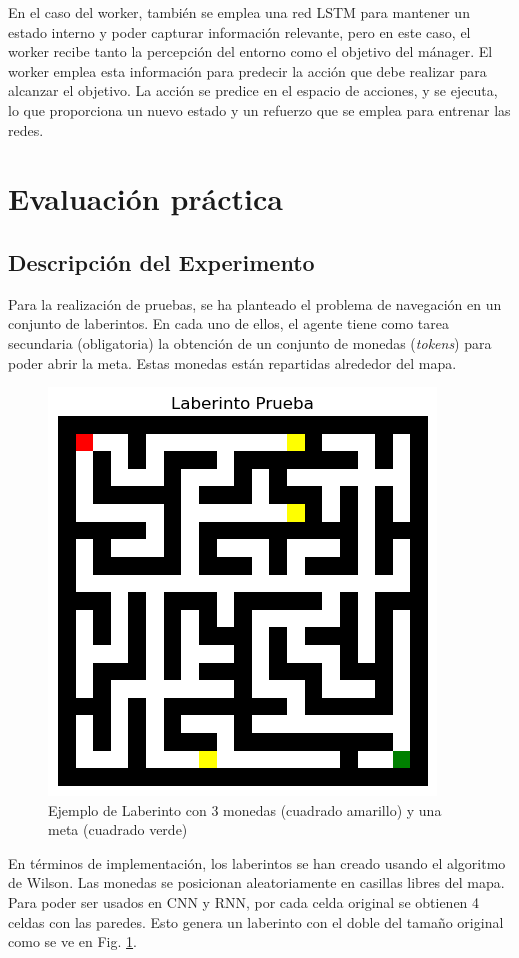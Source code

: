 \documentclass[letterpaper]{article} %
\begin{document}
En el caso del worker, también se emplea una red LSTM para mantener un estado interno y poder capturar información relevante,
pero en este caso, el worker recibe tanto la percepción del entorno como el objetivo del mánager. El worker emplea esta información
para predecir la acción que debe realizar para alcanzar el objetivo. La acción se predice en el espacio de acciones, y se ejecuta,
lo que proporciona un nuevo estado y un refuerzo que se emplea para entrenar las redes.

\section{Evaluación práctica}
\subsection{Descripción del Experimento}

Para la realización de pruebas, se ha planteado el problema de navegación en un conjunto de laberintos. 
En cada uno de ellos, el agente tiene como tarea secundaria (obligatoria) la obtención de un conjunto de 
monedas (\textit{tokens}) para poder abrir la meta. Estas monedas están repartidas alrededor del mapa.

\begin{figure}[H]
    \centering
    \includegraphics[width=0.7\columnwidth]{maze.png}
    \caption{Ejemplo de Laberinto con 3 monedas (cuadrado amarillo) y una meta (cuadrado verde)\label{fig:maze-example}}
\end{figure}

En términos de implementación, los laberintos se han creado usando el algoritmo de Wilson. Las monedas se posicionan
aleatoriamente en casillas libres del mapa. Para poder ser usados en CNN y RNN, por cada celda original se obtienen 4 celdas con las paredes.
Esto genera un laberinto con el doble del tamaño original como se ve en Fig. \ref{fig:maze-example}.
\end{document}
